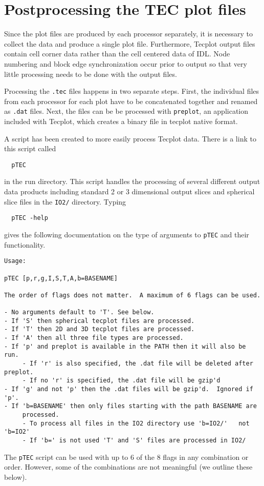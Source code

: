 \section{Postprocessing the TEC plot files \label{section:posttec}}

Since the plot files are produced by each processor separately, it is
necessary to collect the data and produce a single plot file. 
Furthermore, Tecplot output files contain cell corner data rather
than the cell centered data of IDL.  Node numbering and block edge
synchronization occur prior to output so that very little processing
needs to be done with the output files.

Processing the {\tt .tec} files happens in two separate steps.  First,
the individual files from each processor for each plot have to be 
concatenated together and renamed as {\tt .dat} files.  Next, the
files can be be processed with {\tt preplot}, an application
included with Tecplot, which creates a binary file in tecplot native format.

A script has been created to more easily process Tecplot data.  There
is a link to this script called 
\begin{verbatim}
  pTEC
\end{verbatim}
in the run directory.  This script handles the processing of several
different output data products including standard 2 or 3 dimensional
output slices and spherical slice files in the {\tt IO2/} directory.
Typing
\begin{verbatim}
  pTEC -help
\end{verbatim}
gives the following documentation on the type of arguments to {\tt pTEC} 
and their functionality.
\begin{verbatim}
Usage:

pTEC [p,r,g,I,S,T,A,b=BASENAME]

The order of flags does not matter.  A maximum of 6 flags can be used.       

- No arguments default to 'T'. See below.                                    
- If 'S' then spherical tecplot files are processed.                         
- If 'T' then 2D and 3D tecplot files are processed.                         
- If 'A' then all three file types are processed.                            
- If 'p' and preplot is available in the PATH then it will also be run.      
     - If 'r' is also specified, the .dat file will be deleted after preplot.
     - If no 'r' is specified, the .dat file will be gzip'd                  
- If 'g' and not 'p' then the .dat files will be gzip'd.  Ignored if 'p'.    
- If 'b=BASENAME' then only files starting with the path BASENAME are        
     processed.                                                              
     - To process all files in the IO2 directory use 'b=IO2/'   not 'b=IO2'  
     - If 'b=' is not used 'T' and 'S' files are processed in IO2/
\end{verbatim}
The {\tt pTEC} script can be used with up to 6 of the 8 flags in any
combination or order.  However, some of the combinations are not
meaningful (we outline these below).

